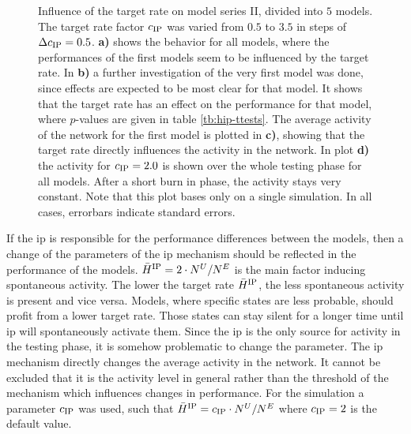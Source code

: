 \begin{figure}[!t]
    \caption[Influence of the IP target rate]{Influence of the target rate on model series II, divided into $5$ models. The target rate factor $c_{\text{IP}}$ was varied from $0.5$ to $3.5$ in steps of $\Delta c_{\text{IP}} = 0.5$. \textbf{a)} shows the behavior for all models, where the performances of the first models seem to be influenced by the target rate. In \textbf{b)} a further investigation of the very first model was done, since effects are expected to be most clear for that model. It shows that the target rate has an effect on the performance for that model, where $p$-values are given in table \ref{tb:hip-ttests}. The average activity of the network for the first model is plotted in \textbf{c)}, showing that the target rate directly influences the activity in the network. In plot \textbf{d)} the activity for $c_{\text{IP}} = 2.0$ is shown over the whole testing phase for all models. After a short burn in phase, the activity stays very constant. Note that this plot bases only on a single simulation. In all cases, errorbars indicate standard errors.}
    \label{fig:hip-influence}
\end{figure}

If the \acl{ip} is responsible for the performance differences between the models, then a change of the parameters of the \acs{ip} mechanism should be reflected in the performance of the models. $\bar H^{\text{IP}} = 2\cdot N^U/N^E$ is the main factor inducing spontaneous activity. The lower the target rate $\bar H^{\text{IP}}$, the less spontaneous activity is present and vice versa. Models, where specific states are less probable, should profit from a lower target rate. Those states can stay silent for a longer time until \acl{ip} will spontaneously activate them. Since the \acs{ip} is the only source for activity in the testing phase, it is somehow problematic to change the parameter. The \acs{ip} mechanism directly changes the average activity in the network. It cannot be excluded that it is the activity level in general rather than the threshold of the mechanism which influences changes in performance. For the simulation a parameter $c_{\text{IP}}$ was used, such that $\bar H^{\text{IP}} = c_{\text{IP}} \cdot N^U/N^E$ where $c_{\text{IP}} = 2$ is the default value.

